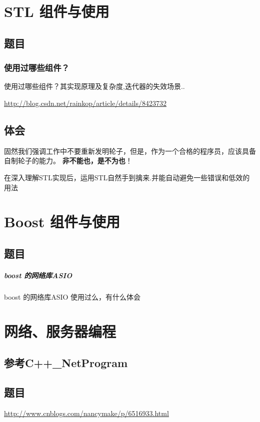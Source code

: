 \documentclass[UTF8,a4paper,8pt]{ctexart}
\begin{document}
\section{STL 组件与使用}
	\subsection{题目}
		\subsubsection{使用过哪些组件？} 使用过哪些组件？其实现原理及复杂度,迭代器的失效场景..
		
		\url{http://blog.csdn.net/rainkop/article/details/8423732}

	\subsection{体会}
		固然我们强调工作中不要重新发明轮子，但是，作为一个合格的程序员，应该具备自制轮子的能力。
		\textbf{非不能也，是不为也}！
		
		在深入理解STL实现后，运用STL自然手到擒来.并能自动避免一些错误和低效的用法
		
		
\newpage
\section{Boost 组件与使用}
	\subsection{题目}
		\subparagraph{boost 的网络库ASIO}  boost 的网络库ASIO 使用过么，有什么体会
		

\newpage
\section{网络、服务器编程}
	\subsection{参考C++\_NetProgram}
	
	\subsection{题目}
		\url{http://www.cnblogs.com/nancymake/p/6516933.html}
		
\end{document}

